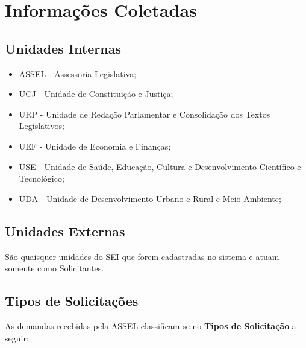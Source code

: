\chapter{Informações Coletadas}


\section{Unidades Internas}

\begin{itemize}
	\item ASSEL - Assessoria Legislativa;
	\item UCJ - Unidade de Constituição e Justiça;
	\item URP - Unidade de Redação Parlamentar e Consolidação dos Textos Legislativos;
	\item UEF - Unidade de Economia e Finanças;
	\item USE - Unidade de Saúde, Educação, Cultura e Desenvolvimento Científico e Tecnológico; 
	\item UDA - Unidade de Desenvolvimento Urbano e Rural e Meio Ambiente;
\end{itemize}


\section{Unidades Externas}

São quaisquer unidades do SEI que forem cadastradas no sistema e atuam somente como Solicitantes.


\section{Tipos de Solicitações}


As demandas recebidas pela ASSEL classificam-se no \textbf{Tipos de Solicitação} a seguir:



